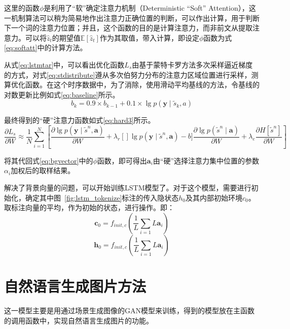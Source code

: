 这里的函数$\phi$是利用了“软”确定注意力机制（Deterministic “Soft” Attention），这一机制算法可以稍为简易地作出注意力正确位置的判断，可以作出计算，用于判断下一个词的注意力位置；并且，这个函数的目的是计算注意力，而非前文从提取注意力。可以将$\hat{z}_t$的期望值$\mathbb{E} [\hat{z}_t]$作为其取值，带入计算，即设定$\phi$函数为式\eqref{eq:softatt}中的计算方法。

从式\eqref{eq:lstmtar}中，可以看出优化函数$L_s$由基于蒙特卡罗方法多次采样逼近梯度的方式，对式\eqref{eq:stdistribute}遵从多次伯努力分布的注意力区域位置进行采样，测算优化函数。在这个时序数据中，为了消除，使用滑动平均基线的方法，令基线的对数更新比例如式\eqref{eq:baseline}所示。
\begin{equation}
    \label{eq:baseline}
    b_k = 0.9 \times b_{k-1} + 0.1 \times \lg p(\textbf{y} \mid \tilde{s}_k, a)
\end{equation}

最终得到的“硬”注意力函数如式\eqref{eq:hard3}所示。
\begin{equation}
    \frac{\partial L_s}{\partial W} \approx \frac{1}{N} \sum_{i=1}^N\left[\frac{\partial \lg p(\textbf{y}\mid \tilde{s}^n,\textbf{a})}{\partial W} + \lambda_r[]\lg p(\textbf{y}\mid \tilde{s}^n,\textbf{a})-b] \frac{\partial \lg p(\tilde{s}^n \mid \textbf{a})}{\partial W} +\lambda_e\frac{\partial H[\tilde{s}^n]}{\partial W}\right]
    \label{eq:hard3}
\end{equation}

将其代回式\eqref{eq:bgvector}中的$\phi$函数，即可得出${\textbf{a}_i}$由“硬”选择注意力集中位置的参数${\alpha_i}$加权后的取样结果。

解决了背景向量的问题，可以开始训练LSTM模型了。对于这个模型，需要进行初始化，确定其中图~\ref{fig:lstm_tokenize}标注的传入隐状态$h_0$及其内部初始环境$c_0$。取标注向量的平均，作为初始的状态，进行操作。即：
$$\textbf{c}_0 = f_{init,c}\left(\frac{1}{L}\sum_{i=1}{L}\textbf{a}_i\right)$$
$$\textbf{h}_0 = f_{init,c}\left(\frac{1}{L}\sum_{i=1}{L}\textbf{a}_i\right)$$

\section{自然语言生成图片方法}
这一模型主要是用通过场景生成图像的GAN模型来训练，得到的模型放在主函数的调用函数中，实现自然语言生成图片的功能。

